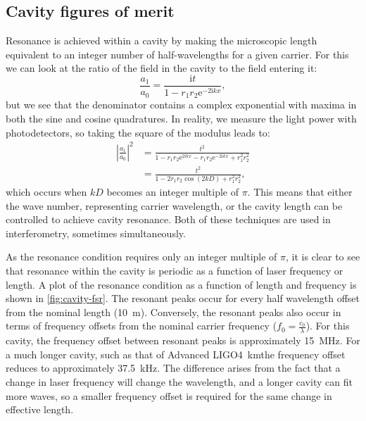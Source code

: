 \subsection{\label{sec:cavity-fom}Cavity figures of merit}
Resonance is achieved within a \FP{} cavity by making the microscopic length equivalent to an integer number of half-wavelengths for a given carrier. For this we can look at the ratio of the field in the cavity to the field entering it:
\begin{equation}
  \frac{a_1}{a_0} = \frac{\text{i} t}{1 - r_1 r_2 \text{e}^{-2\text{i}kx}},
\end{equation}
but we see that the denominator contains a complex exponential with maxima in both the sine and cosine quadratures. In reality, we measure the light power with photodetectors, so taking the square of the modulus leads to:
\begin{equation}
  \begin{split}
    \left|\frac{a_1}{a_0}\right|^2 &= \frac{t^2}{1-r_1 r_2 \text{e}^{2\text{i}kx} - r_1 r_2 \text{e}^{-2\text{i}kx} + r_1^2 r_2^2} \\
                                   &= \frac{t^2}{1 - 2 r_1 r_2 \cos{\left( 2kD \right)} + r_1^2 r_2^2},
  \end{split}
\end{equation}
which occurs when $kD$ becomes an integer multiple of $\pi$. This means that either the wave number, representing carrier wavelength, or the cavity length can be controlled to achieve cavity resonance. Both of these techniques are used in interferometry, sometimes simultaneously.

As the resonance condition requires only an integer multiple of $\pi$, it is clear to see that resonance within the cavity is periodic as a function of laser frequency or length. A plot of the resonance condition as a function of length and frequency is shown in \cref{fig:cavity-fsr}. The resonant peaks occur for every half wavelength offset from the nominal length (\SI{10}{\meter}). Conversely, the resonant peaks also occur in terms of frequency offsets from the nominal carrier frequency ($f_0 = \frac{c_0}{\lambda}$). For this cavity, the frequency offset between resonant peaks is approximately \SI{15}{\mega\hertz}. For a much longer cavity, such as that of Advanced LIGO\textemdash \SI{4}{\kilo\meter}\textemdash the frequency offset reduces to approximately \SI{37.5}{\kilo\hertz}. The difference arises from the fact that a change in laser frequency will change the wavelength, and a longer cavity can fit more waves, so a smaller frequency offset is required for the same change in effective length.

